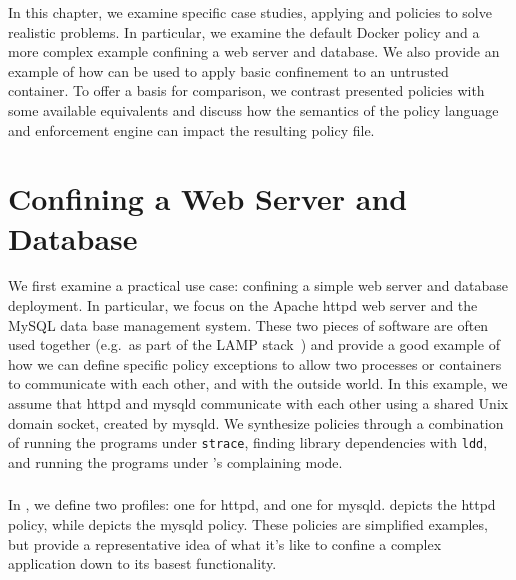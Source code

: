 In this chapter, we examine specific case studies, applying \bpfbox{} and \bpfcontain{}
policies to solve realistic problems. In particular, we examine the default Docker policy
and a more complex example confining a web server and database. We also provide an example
of how \bpfcontain{} can be used to apply basic confinement to an untrusted container. To
offer a basis for comparison, we contrast presented policies with some available
equivalents and discuss how the semantics of the policy language and enforcement engine
can impact the resulting policy file.


%
\section{Confining a Web Server and Database}

We first examine a practical use case: confining a simple web server and database
deployment. In particular, we focus on the Apache httpd web server and the MySQL data base
management system. These two pieces of software are often used together (e.g.\ as part of
the LAMP stack~\cite{lamp}) and provide a good example of how we can define specific
policy exceptions to allow two processes or containers to communicate with each other, and
with the outside world. In this example, we assume that httpd and mysqld communicate with
each other using a shared Unix domain socket, created by mysqld. We synthesize policies
through a combination of running the programs under \texttt{strace}, finding library
dependencies with \texttt{ldd}, and running the programs under \bpfcontain{}'s complaining
mode.

\subsubsection{\bpfbox{}}

In \bpfbox{}, we define two profiles: one for httpd, and one for mysqld.
 depicts the httpd policy, while  depicts
the mysqld policy. These policies are simplified examples, but provide a representative
idea of what it's like to confine a complex application down to its basest functionality.

